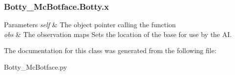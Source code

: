 \subsubsection[{\texorpdfstring{x}{x}}]{\setlength{\rightskip}{0pt plus 5cm}Botty\+\_\+\+Mc\+Botface.\+Botty.\+x\hspace{0.3cm}{\ttfamily [static]}}\hypertarget{classBotty__McBotface_1_1Botty_ab149b8002cbcdcce9eee529f42c07d0f}{}\label{classBotty__McBotface_1_1Botty_ab149b8002cbcdcce9eee529f42c07d0f}

\begin{DoxyParams}{Parameters}
{\em self} & The object pointer calling the function \\
\hline
{\em obs} & The observation maps Sets the location of the base for use by the AI. \\
\hline
\end{DoxyParams}


The documentation for this class was generated from the following file\+:\begin{DoxyCompactItemize}
\item 
Botty\+\_\+\+Mc\+Botface.\+py\end{DoxyCompactItemize}
